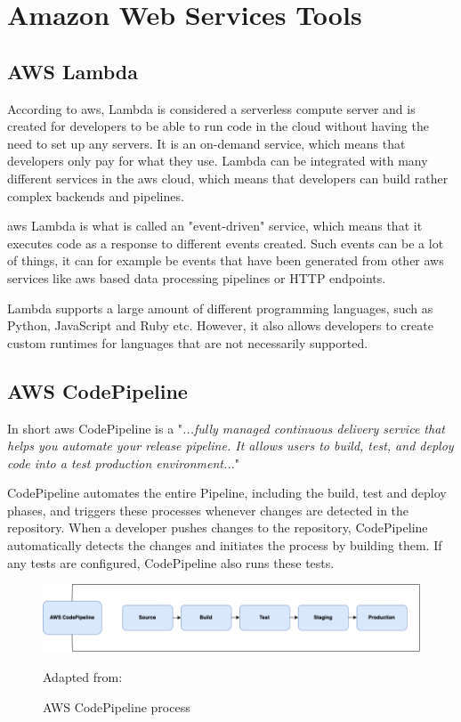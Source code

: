 \section{Amazon Web Services Tools}
\subsection{AWS Lambda}
According to \acrshort{aws},  Lambda is considered a serverless compute server and is created for developers to be able to run code in the cloud without having the need to set up any servers.\cite{AWSLamda} It is an on-demand service, which means that developers only pay for what they use. Lambda can be integrated with many different services in the \acrshort{aws} cloud, which means that developers can build rather complex backends and pipelines. 

\acrshort{aws} Lambda is what is called an "event-driven" service, which means that it executes code as a response to different events created. Such events can be a lot of things, it can for example be events that have been generated from other \acrshort{aws} services like \acrshort{aws} based data processing pipelines or HTTP endpoints. 

Lambda supports a large amount of different programming languages, such as Python, JavaScript and Ruby etc. However, it also allows developers to create custom runtimes for languages that are not necessarily supported. 



\subsection{AWS CodePipeline}
In short \acrshort{aws} CodePipeline is a "\textit{...fully managed continuous delivery service that helps you automate your release pipeline. It allows users to build, test, and deploy code into a test production environment...}"
\cite{AWSCodePipeline}

CodePipeline automates the entire \gls{Pipeline}, including the build, test and deploy phases, and triggers these processes whenever changes are detected in the repository. When a developer pushes changes to the repository, CodePipeline automatically detects the changes and initiates the process by building them. If any tests are configured, CodePipeline also runs these tests.\cite{AWSCodePipeline1}
\begin{figure}[H]
    \centering
    \includegraphics[scale=0.4]{Images/CodePipeline.png}
    \caption{AWS CodePipeline process}Adapted from: \cite{AWSCodePipeline2}
    \label{fig:AWS CodePipeline Process}
\end{figure}

